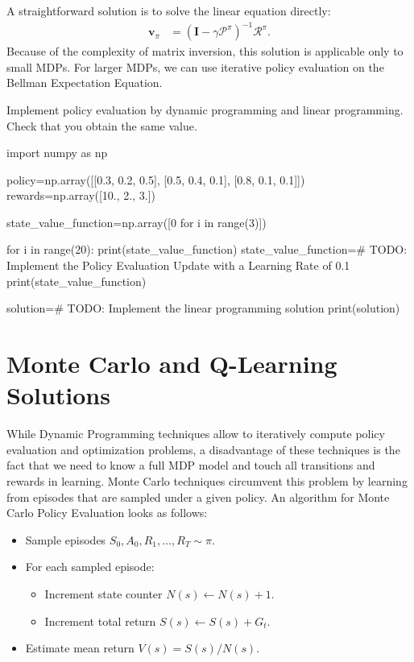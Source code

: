 \noindent A straightforward solution is to solve the linear equation directly:
\begin{align*}
    \boldsymbol{v}_{\pi} & = (\boldsymbol{I} -  \gamma \boldsymbol{\mathcal{P}}^{\pi})^{-1} \boldsymbol{\mathcal{R}}^{\pi}.
\end{align*}
Because of the complexity of matrix inversion, this solution is applicable only to small MDPs. For larger MDPs, we can use iterative policy evaluation on the Bellman Expectation Equation.

\begin{exercise}
\label{exercise:PolicyEvaluation}
Implement policy evaluation by dynamic programming and linear programming. Check that you obtain the same value.

\begin{python}
import numpy as np

policy=np.array([[0.3, 0.2, 0.5], [0.5, 0.4, 0.1], [0.8, 0.1, 0.1]])
rewards=np.array([10., 2., 3.])

state_value_function=np.array([0 for i in range(3)])

for i in range(20):
    print(state_value_function)
    state_value_function=# TODO: Implement the Policy Evaluation Update with a Learning Rate of 0.1
print(state_value_function)

solution=# TODO: Implement the linear programming solution
print(solution)
\end{python}
\end{exercise}

\section{Monte Carlo and Q-Learning Solutions}

While Dynamic Programming techniques allow to iteratively compute policy evaluation and optimization problems, a disadvantage of these techniques is the fact that we need to know a full MDP model and touch all transitions and rewards in learning. Monte Carlo techniques circumvent this problem by learning from episodes that are sampled under a given policy. An algorithm for Monte Carlo Policy Evaluation looks as follows: 
\begin{itemize}
  \item Sample episodes $S_0, A_0, R_1, \ldots, R_T \sim \pi$.
    \item For each sampled episode:
  \begin{itemize}
  \item Increment state counter $N(s) \leftarrow N(s) + 1$.
  \item Increment total return $S(s) \leftarrow S(s) + G_t$.
    \end{itemize}
  \item Estimate mean return $V(s) = S(s)/N(s)$.
  \end{itemize}

